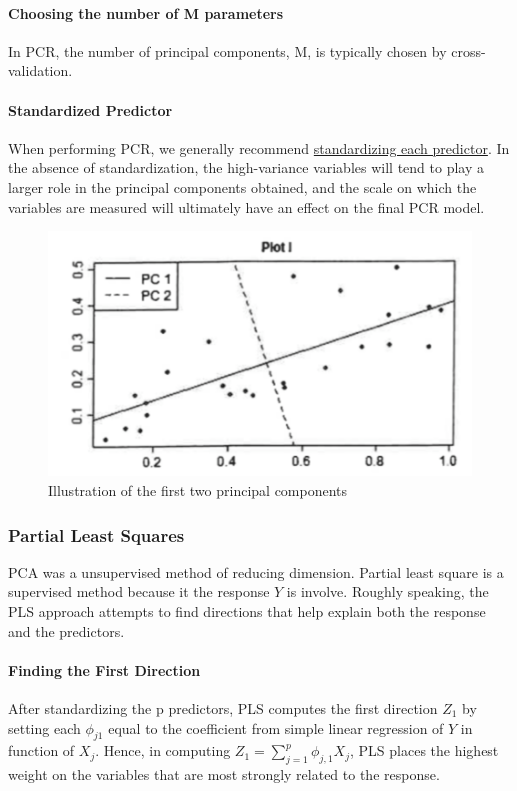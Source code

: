 \paragraph{Choosing the number of M parameters} In PCR, the number of principal components, M, is typically chosen by cross-validation.

\paragraph{Standardized Predictor} When performing PCR, we generally recommend \hyperref[note:StandardizedCoefficient]{standardizing each predictor}. In the absence of standardization, the high-variance variables will tend to play a larger role in the principal components obtained, and the scale on which the variables are measured will ultimately have an effect on the final PCR model.

\begin{figure}[!ht]
    \centering
    \includegraphics[scale=0.7]{src/StatisticalLearning/PCA.png}
    \caption{Illustration of the first two principal components}
\end{figure}

\subsubsection{Partial Least Squares}
PCA was a unsupervised method of reducing dimension. Partial least square is a supervised method because it the response $Y$ is involve. Roughly speaking, the PLS approach attempts to find directions that help explain both the response and the predictors.

\paragraph{Finding the First Direction}After standardizing the p predictors, PLS computes the first direction $Z_1$ by setting each $\phi_{j1}$ equal to the coefficient from simple linear regression of $Y$ in function of $X_j$. Hence, in computing $Z_1 = \sum_{j=1}^p \phi_{j,1}X_j$, PLS places the highest weight on the variables that are most strongly related to the response.

